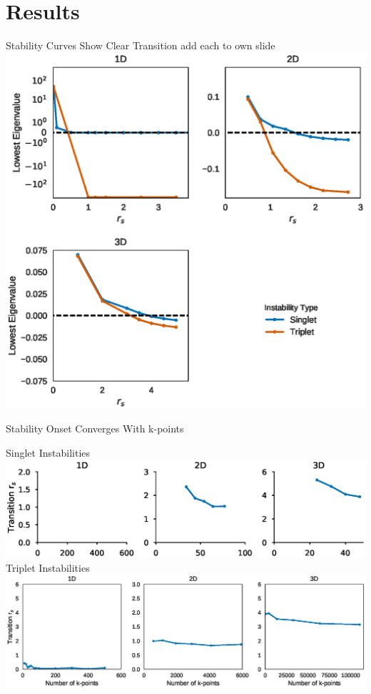 \documentclass[10pt]{beamer}
\begin{document}
{{{{{{{{{{{\section{Results}
{%
\begin{frame}{Stability Curves Show Clear Transition}
  \centering
  add each to own slide
	\includegraphics[width=0.75\linewidth]{../figures/stability.eps}
\end{frame}

\begin{frame}{Stability Onset Converges With k-points}
  \centering 
  \begin{overprint}
    \centering
    \centering Singlet Instabilities\\ \vspace{5mm}
    \includegraphics[width=\linewidth]{../figures/singlet_onset.eps}
  	\onslide<2>\centering Triplet Instabilities\\ \vspace{5mm}
  	\includegraphics[width=\linewidth]{../figures/triplet_onset.eps}
	\end{overprint}
\end{frame}



}}}}}}}}}}}}
\end{document}
